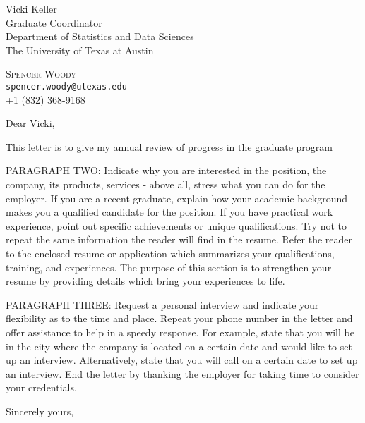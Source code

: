 \documentclass[12pt]{letter}
\begin{document}

\begin{letter}{Vicki Keller \\
Graduate Coordinator \\
Department of Statistics and Data Sciences \\
The University of Texas at Austin} 


\begin{center}
\large \textsc{Spencer Woody} \\ 
\small \texttt{spencer.woody@utexas.edu} \\ +1 (832) 368-9168 
\end{center} 

\bigskip

\signature{Spencer Woody} 


\opening{Dear Vicki,} 

This letter is to give my annual review of progress in the graduate
program

PARAGRAPH TWO: Indicate why you are interested in the position, the
company, its products, services - above all, stress what you can do
for the employer. If you are a recent graduate, explain how your
academic background makes you a qualified candidate for the
position. If you have practical work experience, point out specific
achievements or unique qualifications. Try not to repeat the same
information the reader will find in the resume. Refer the reader to
the enclosed resume or application which summarizes your
qualifications, training, and experiences. The purpose of this section
is to strengthen your resume by providing details which bring your
experiences to life.
 
PARAGRAPH THREE: Request a personal interview and indicate your
flexibility as to the time and place. Repeat your phone number in the
letter and offer assistance to help in a speedy response. For example,
state that you will be in the city where the company is located on a
certain date and would like to set up an interview. Alternatively,
state that you will call on a certain date to set up an interview. End
the letter by thanking the employer for taking time to consider your
credentials.

\closing{Sincerely yours,}





\end{letter}
\end{document}
